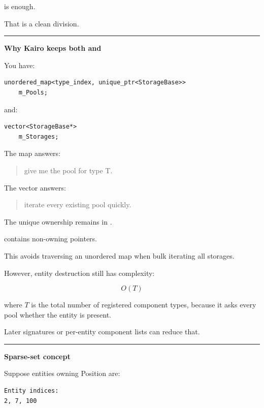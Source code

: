 is enough.

That is a clean division.

\begin{center}\rule{0.5\linewidth}{0.5pt}\end{center}

\textbf{Why Kairo keeps both  and }

You have:

\begin{verbatim}
unordered_map<type_index, unique_ptr<StorageBase>>
    m_Pools;
\end{verbatim}

and:

\begin{verbatim}
vector<StorageBase*>
    m_Storages;
\end{verbatim}

The map answers:

\begin{quote}
give me the pool for type T.
\end{quote}

The vector answers:

\begin{quote}
iterate every existing pool quickly.
\end{quote}

The unique ownership remains in .

 contains non-owning pointers.

This avoids traversing an unordered map when bulk iterating all storages.

However, entity destruction still has complexity:

\[
O(T)
\]

where \(T\) is the total number of registered component types, because it asks every pool whether the entity is present.

Later signatures or per-entity component lists can reduce that.

\begin{center}\rule{0.5\linewidth}{0.5pt}\end{center}

\textbf{Sparse-set concept}

Suppose entities owning Position are:

\begin{verbatim}
Entity indices:
2, 7, 100
\end{verbatim}

